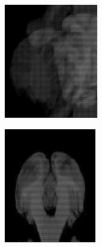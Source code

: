 \begin{figure}[h]
\centering
\begin{subfigure}{.3\textwidth}
  \centering
  \includegraphics[width=\textwidth]{imgs/CutA}
\end{subfigure}%
\space\space\space
\begin{subfigure}{.3\textwidth}
  \centering
  \includegraphics[width=\textwidth]{imgs/CutB}

\end{subfigure}
\end{figure}
